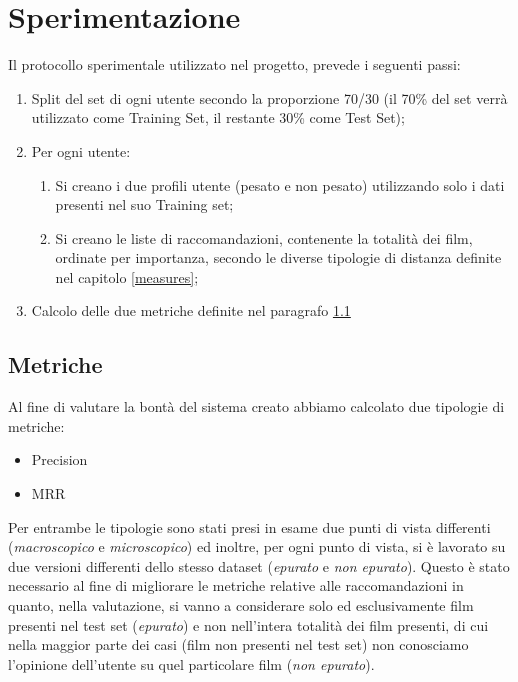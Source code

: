 \section{Sperimentazione}
\label{experiment}

Il protocollo sperimentale utilizzato nel progetto, prevede i seguenti passi:
\begin{enumerate}
\item Split del set di ogni utente secondo la proporzione 70/30 (il 70\% del set verrà utilizzato come Training Set, il restante 30\% come Test Set);
\item Per ogni utente:
    \begin{enumerate}
        \item Si creano i due profili utente (pesato e non pesato) utilizzando solo i dati presenti nel suo Training set;
        \item Si creano le liste di raccomandazioni, contenente la totalità dei film, ordinate per importanza, secondo le diverse tipologie di distanza definite nel capitolo \ref{measures};
    \end{enumerate}
\item Calcolo delle due metriche definite nel paragrafo \ref{metriche}
\end{enumerate}

\subsection{Metriche}
\label{metriche}
Al fine di valutare la bontà del sistema creato abbiamo calcolato due tipologie di metriche:
\begin{itemize}
\item Precision
\item MRR
\end{itemize}
Per entrambe le tipologie sono stati presi in esame due punti di vista differenti (\emph{macroscopico} e \emph{microscopico}) ed inoltre, per ogni punto di vista, si è lavorato su due versioni differenti dello stesso dataset (\emph{epurato} e \emph{non epurato}). Questo è stato necessario al fine di migliorare le metriche relative alle raccomandazioni in quanto, nella valutazione, si vanno a considerare solo ed esclusivamente film presenti nel test set (\emph{epurato}) e non nell'intera totalità dei film presenti, di cui nella maggior parte dei casi (film non presenti nel test set) non conosciamo l'opinione dell'utente su quel particolare film (\emph{non epurato}).

